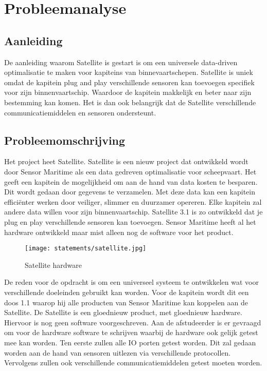 \chapter{Probleemanalyse}

\section{Aanleiding}
De aanleiding waarom Satellite is gestart is om een universele data-driven optimalisatie te maken voor kapiteins van binnevaartschepen. Satellite is uniek omdat de kapitein plug and play verschillende sensoren kan toevoegen specifiek voor zijn binnenvaartschip. Waardoor de kapitein makkelijk en beter naar zijn bestemming kan komen. Het is dan ook belangrijk dat de Satellite verschillende communicatiemiddelen en sensoren ondersteunt.

\section{Probleemomschrijving}
Het project heet Satellite. Satellite is een nieuw project dat ontwikkeld wordt door Sensor Maritime als een data gedreven optimalisatie voor scheepvaart. Het geeft een kapitein de mogelijkheid om aan de hand van data kosten te besparen. Dit wordt gedaan door gegevens te verzamelen. Met deze data kan een kapitein efficiënter werken door veiliger, slimmer en duurzamer opereren. Elke kapitein zal andere data willen voor zijn binnenvaartschip. Satellite 3.1 is zo ontwikkeld dat je plug en play verschillende sensoren kan toevoegen. Sensor Maritime heeft al het hardware ontwikkeld maar mist alleen nog de software voor het product.
\begin{figure}[h!]
	\begin{centering}
		\caption{Satellite hardware}
	\texttt{[image: statements/satellite.jpg]}

	\label{fig:shw}
	\end{centering}
\end{figure}
\newpage
\noindent De reden voor de opdracht is om een universeel systeem te ontwikkelen wat voor verschillende doeleinden gebruikt kan worden. Voor de kapitein wordt dit een doos 1.1 waarop hij alle producten van Sensor Maritime kan koppelen aan de Satellite. De Satellite is een gloednieuw product, met gloednieuw hardware. Hiervoor is nog geen software voorgeschreven. Aan de afstudeerder is er gevraagd om voor de hardware software te schrijven waarbij de hardware ook gelijk getest mee kan worden. Ten eerste zullen alle IO porten getest worden. Dit zal gedaan worden aan de hand van sensoren uitlezen via verschillende protocollen. Vervolgens zullen ook verschillende communicatiemiddelen getest moeten worden.

